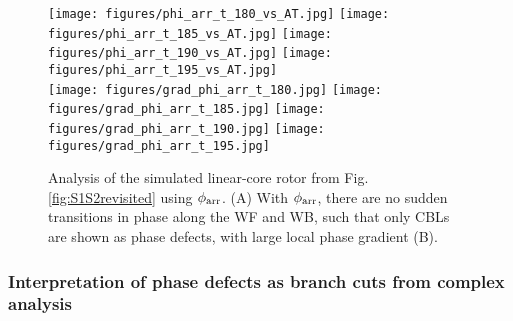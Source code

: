 \documentclass{article}
\newcommand{\phiarr}{\ensuremath{\phi_{\rm arr}}}
\newcommand{\figspiralphiarr}{3.5cm}
\begin{document}
\begin{figure}
     \texttt{[image: figures/phi\_arr\_t\_180\_vs\_AT.jpg]}
    \texttt{[image: figures/phi\_arr\_t\_185\_vs\_AT.jpg]}
    \texttt{[image: figures/phi\_arr\_t\_190\_vs\_AT.jpg]}
    \texttt{[image: figures/phi\_arr\_t\_195\_vs\_AT.jpg]} \\
    
    \texttt{[image: figures/grad\_phi\_arr\_t\_180.jpg]}
    \texttt{[image: figures/grad\_phi\_arr\_t\_185.jpg]}
    \texttt{[image: figures/grad\_phi\_arr\_t\_190.jpg]}
    \texttt{[image: figures/grad\_phi\_arr\_t\_195.jpg]}
        \caption{Analysis of the simulated linear-core rotor from Fig. \ref{fig:S1S2revisited} using $\phiarr$. (A) With $\phiarr$, there are no sudden transitions in phase along the WF and WB, such that only CBLs are shown as phase defects, with large local phase gradient (B).  }
    \label{fig:S1S2revisited_phiarr}
\end{figure}

\subsubsection{Interpretation of phase defects as branch cuts from complex analysis}

\end{document}
